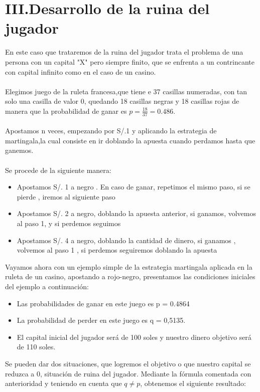 \documentclass[letterpaper, 10 pt, conference]{ieeeconf}  %
\begin{document}
\section*{III.Desarrollo de la ruina del jugador}
En este caso que trataremos de la ruina del jugador trata el problema de  una persona con un capital "X" pero
siempre finito, que se enfrenta a un contrincante con capital infinito como en el caso de un
casino.\\
 \\
 Elegimos juego de la ruleta francesa,que tiene e 37 casillas numeradas, con tan solo una casilla de valor 0, quedando 18 casillas negras y 18 casillas rojas de manera que la probabilidad de ganar es $p=\frac{18}{37}=0.486$.\\\\
Apostamos n veces, empezando por S/.1 y aplicando la estrategia de martingala,la cual consiste en ir doblando la apuesta cuando
perdamos hasta que ganemos.\\\\
Se procede de la siguiente manera:
\begin{itemize}
    \item Apostamos S/. 1 a negro . En caso de ganar, repetimos el mismo paso, si se pierde , iremos al siguiente paso
    \item Apostamos S/. 2 a negro, doblando la apuesta anterior, si ganamos, volvemos al paso 1, y si perdemos seguimos
    \item Apostamos S/. 4 a negro, doblando la cantidad de dinero, si ganamos , volvemos al paso 1 , si perdemos seguiremos doblando la apuesta 
\end{itemize}
Vayamos ahora con un ejemplo simple de la estrategia martingala aplicada en la ruleta
de un casino, apostando a rojo-negro, presentamos las condiciones iniciales del ejemplo a
continuación:
\begin{itemize}
    \item Las probabilidades de ganar en este juego es p = 0.4864
    \item La probabilidad de perder en este juego es q = 0,5135.
    \item El capital inicial del jugador será de 100 soles y nuestro dinero objetivo será de 110 soles.
\end{itemize}
Se pueden dar dos situaciones, que logremos el objetivo o que nuestro capital se reduzca a 0, situación de ruina del jugador. Mediante la fórmula
comentada con anterioridad y teniendo en cuenta que $q \not = p$, obtenemos el siguiente
resultado:
\end{document}
